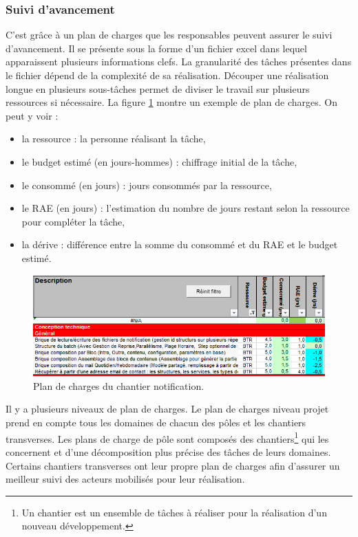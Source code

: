 \documentclass[12pt,a4paper]{article}
\begin{document}
\subsubsection{Suivi d’avancement}
C'est grâce à un plan de charges que les responsables peuvent assurer le suivi d'avancement. Il se présente sous la forme d'un fichier excel dans lequel apparaissent plusieurs informations clefs. La granularité des tâches présentes dans le fichier dépend de la complexité de sa réalisation. Découper une réalisation longue en plusieurs sous-tâches permet de diviser le travail sur plusieurs ressources si nécessaire. La figure \ref{pdc} montre un exemple de plan de charges.
On peut  y voir :
\begin{itemize}
\item la ressource : la personne réalisant la tâche,
\item le budget estimé (en jours-hommes) : chiffrage initial de la tâche,
\item le consommé (en jours) : jours consommés par la ressource,
\item le \gls{RAE} (en jours) : l'estimation du nombre de jours restant selon la ressource pour compléter la tâche,
\item la dérive : différence entre la somme du consommé et du \gls{RAE} et le budget estimé.
\end{itemize}
\begin{figure}[H]
	\begin{center}
		\includegraphics[width=\textwidth,height=\textheight,keepaspectratio]{planDeCharge.png}
		\caption{Plan de charges du chantier notification.}
		\label{pdc}
	\end{center}
\end{figure}
Il y a plusieurs niveaux de plan de charges. Le plan de charges niveau projet prend en compte tous les domaines de chacun des pôles et les chantiers transverses. Les plans de charge de pôle sont composés des chantiers\footnote{Un chantier est un ensemble de tâches à réaliser pour la réalisation d'un nouveau développement.} qui les concernent et d'une décomposition plus précise des tâches de leurs domaines. Certains chantiers transverses ont leur propre plan de charges afin d'assurer un meilleur suivi des acteurs mobilisés pour leur réalisation.
\end{document}
